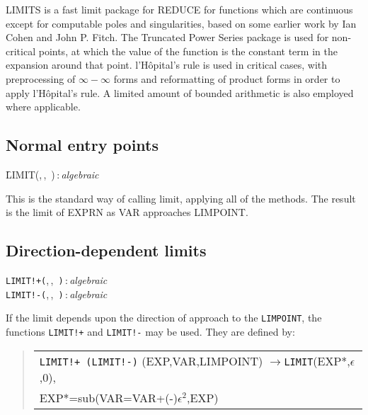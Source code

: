
LIMITS is a fast limit package for REDUCE for functions which are
continuous except for computable poles and singularities, based on some
earlier work by Ian Cohen and John P. Fitch.  The Truncated Power Series
package is used for non-critical points, at which the value of the
function is the constant term in the expansion around that point.
l'H\^opital's rule is used in critical cases, with preprocessing of
$\infty - \infty$ forms and reformatting of product forms in order
to apply l'H\^opital's rule.  A limited amount of bounded arithmetic
is also employed where applicable.

\subsection{Normal entry points}
\hypertarget{operator:LIMIT}{}
\begin{syntax}
  \f{LIMIT(},\,,\,%
    )\,:\,\textit{algebraic}
\end{syntax}

This is the standard way of calling limit, applying all of the methods. The
result is the limit of EXPRN as VAR approaches LIMPOINT.


\subsection{Direction-dependent limits}

 
\hypertarget{operator:LIMIT+}{}
\hypertarget{operator:LIMIT-}{}
\begin{syntaxtable}
  \texttt{LIMIT!+(},\,,\,%
    \texttt{)}\,:\,\textit{algebraic} \\
  \texttt{LIMIT!-(},\,,\,%
    \texttt{)}\,:\,\textit{algebraic}
\end{syntaxtable}

If the limit depends upon the direction of approach to the \texttt{LIMPOINT},
the functions \texttt{LIMIT!+} and \texttt{LIMIT!-} may be used.  They are
defined by:
\begin{quote}
\begin{tabular}{l}
 \texttt{LIMIT!+ (LIMIT!-)} (EXP,VAR,LIMPOINT) $\rightarrow$\texttt{LIMIT}(EXP*,$\epsilon$,0), \\
  \qquad EXP*=sub(VAR=VAR+(-)$\epsilon^2$,EXP)
\end{tabular}
\end{quote}

